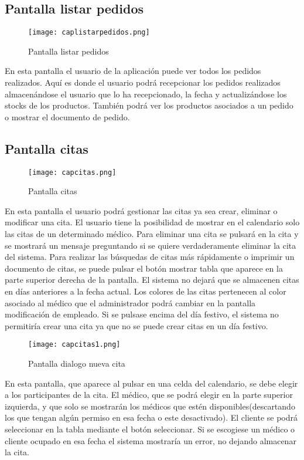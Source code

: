 \newpage
\subsection {Pantalla listar pedidos}

\begin{figure}[!htb]
  \centering
    \texttt{[image: caplistarpedidos.png]}
  \caption{Pantalla listar pedidos}
  \label{a}
\end{figure}

En esta pantalla el usuario de la aplicación puede ver todos los pedidos realizados. Aquí es donde el usuario podrá recepcionar los pedidos realizados almacenándose el usuario que lo ha recepcionado, la fecha y actualizándose los stocks de los productos. También podrá ver los productos asociados a un pedido o mostrar el documento de pedido.

\subsection {Pantalla citas}

\begin{figure}[!htb]
  \centering
    \texttt{[image: capcitas.png]}
  \caption{Pantalla citas}
  \label{a}
\end{figure}

En esta pantalla el usuario podrá gestionar las citas ya sea crear, eliminar o modificar una cita. El usuario tiene la posibilidad de mostrar en el calendario solo las citas de un determinado médico. Para eliminar una cita se pulsará en la cita y se mostrará un mensaje preguntando si se quiere verdaderamente eliminar la cita del sistema. Para realizar las búsquedas de citas más rápidamente o imprimir un documento de citas, se puede pulsar el botón mostrar tabla que aparece en la parte superior derecha de la pantalla. El sistema no dejará que se almacenen citas en días anteriores a la fecha actual. Los colores de las citas pertenecen al color asociado al médico que el administrador podrá cambiar en la pantalla modificación de empleado. Si se pulsase encima del día festivo, el sistema no permitiría crear una cita ya que no se puede crear citas en un día festivo.

\begin{figure}[!htb]
  \centering
    \texttt{[image: capcitas1.png]}
  \caption{Pantalla dialogo nueva cita}
  \label{a}
\end{figure}

En esta pantalla, que aparece al pulsar en una celda del calendario, se debe elegir a los participantes de la cita. El médico, que se podrá elegir en la parte superior izquierda, y que solo se mostrarán los médicos que estén disponibles(descartando los que tengan algún permiso en esa fecha o este desactivado). El cliente se podrá seleccionar en la tabla mediante el botón seleccionar. Si se escogiese un médico o cliente ocupado en esa fecha el sistema mostraría un error, no dejando almacenar la cita.

